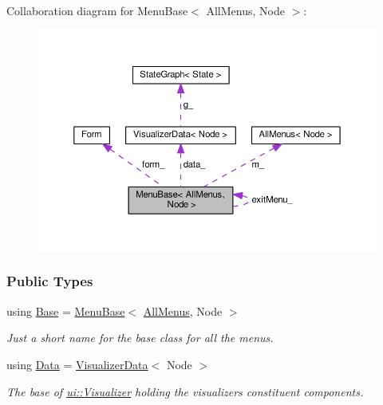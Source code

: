 Collaboration diagram for Menu\+Base$<$ All\+Menus, Node $>$\+:\nopagebreak
\begin{figure}[H]
\begin{center}
\leavevmode
\includegraphics[width=350pt]{structMenuBase__coll__graph}
\end{center}
\end{figure}
\subsubsection*{Public Types}
\begin{DoxyCompactItemize}
\item 
using \hyperlink{structMenuBase_a65fa140b1b2ea26bb4de5473b75a502e}{Base} = \hyperlink{structMenuBase}{Menu\+Base}$<$ \hyperlink{structAllMenus}{All\+Menus}, Node $>$\hypertarget{structMenuBase_a65fa140b1b2ea26bb4de5473b75a502e}{}\label{structMenuBase_a65fa140b1b2ea26bb4de5473b75a502e}

\begin{DoxyCompactList}\small\item\em Just a short name for the base class for all the menus. \end{DoxyCompactList}\item 
using \hyperlink{structMenuBase_a473a45fd8adbc75a9220b64753ae3837}{Data} = \hyperlink{structVisualizerData}{Visualizer\+Data}$<$ Node $>$\hypertarget{structMenuBase_a473a45fd8adbc75a9220b64753ae3837}{}\label{structMenuBase_a473a45fd8adbc75a9220b64753ae3837}

\begin{DoxyCompactList}\small\item\em The base of \hyperlink{structui_1_1Visualizer}{ui\+::\+Visualizer} holding the visualizer\textquotesingle{}s constituent components. \end{DoxyCompactList}\end{DoxyCompactItemize}
